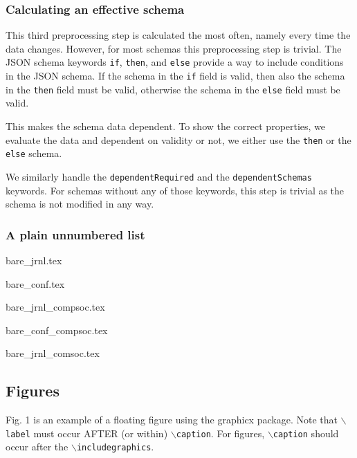 \subsubsection{Calculating an effective schema}

This third preprocessing step is calculated the most often, namely every time the data changes.
However, for most schemas this preprocessing step is trivial.
The JSON schema keywords \texttt{if}, \texttt{then}, and \texttt{else} provide a way to include conditions in the JSON schema.
If the schema in the \texttt{if} field is valid, then also the schema in the \texttt{then} field must be valid, otherwise the
schema in the \texttt{else} field must be valid.

This makes the schema data dependent.
To show the correct properties, we evaluate the data and dependent on validity or not, we either use the \texttt{then} or the \texttt{else} schema.

We similarly handle the \texttt{dependentRequired} and the \texttt{dependentSchemas} keywords.
For schemas without any of those keywords, this step is trivial as the schema is not modified in any way.


\subsubsection*{\bf A plain unnumbered list}
\begin{list}{}{}
    \item{bare\_jrnl.tex}
    \item{bare\_conf.tex}
    \item{bare\_jrnl\_compsoc.tex}
    \item{bare\_conf\_compsoc.tex}
    \item{bare\_jrnl\_comsoc.tex}
\end{list}

\subsection{Figures}
Fig. 1 is an example of a floating figure using the graphicx package.
Note that $\backslash${\tt{label}} must occur AFTER (or within) $\backslash${\tt{caption}}.
For figures, $\backslash${\tt{caption}} should occur after the $\backslash${\tt{includegraphics}}.


